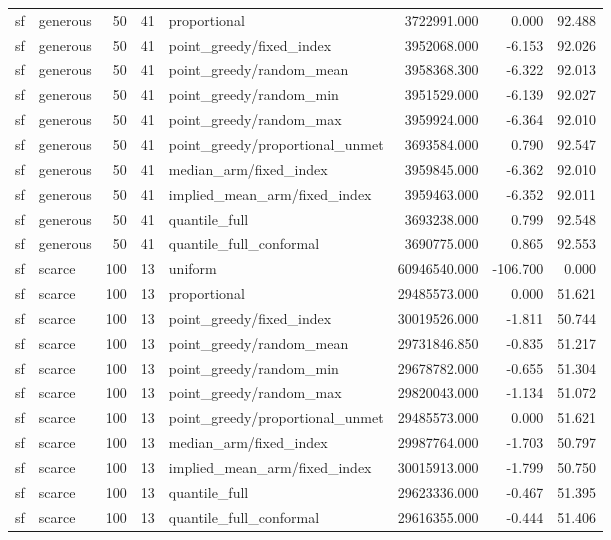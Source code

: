 \begin{tabular}{llrrlrrr}
sf & generous & 50 & 41 & proportional & 3722991.000 & 0.000 & 92.488 \\
sf & generous & 50 & 41 & point\_greedy/fixed\_index & 3952068.000 & -6.153 & 92.026 \\
sf & generous & 50 & 41 & point\_greedy/random\_mean & 3958368.300 & -6.322 & 92.013 \\
sf & generous & 50 & 41 & point\_greedy/random\_min & 3951529.000 & -6.139 & 92.027 \\
sf & generous & 50 & 41 & point\_greedy/random\_max & 3959924.000 & -6.364 & 92.010 \\
sf & generous & 50 & 41 & point\_greedy/proportional\_unmet & 3693584.000 & 0.790 & 92.547 \\
sf & generous & 50 & 41 & median\_arm/fixed\_index & 3959845.000 & -6.362 & 92.010 \\
sf & generous & 50 & 41 & implied\_mean\_arm/fixed\_index & 3959463.000 & -6.352 & 92.011 \\
sf & generous & 50 & 41 & quantile\_full & 3693238.000 & 0.799 & 92.548 \\
sf & generous & 50 & 41 & quantile\_full\_conformal & 3690775.000 & 0.865 & 92.553 \\
sf & scarce & 100 & 13 & uniform & 60946540.000 & -106.700 & 0.000 \\
sf & scarce & 100 & 13 & proportional & 29485573.000 & 0.000 & 51.621 \\
sf & scarce & 100 & 13 & point\_greedy/fixed\_index & 30019526.000 & -1.811 & 50.744 \\
sf & scarce & 100 & 13 & point\_greedy/random\_mean & 29731846.850 & -0.835 & 51.217 \\
sf & scarce & 100 & 13 & point\_greedy/random\_min & 29678782.000 & -0.655 & 51.304 \\
sf & scarce & 100 & 13 & point\_greedy/random\_max & 29820043.000 & -1.134 & 51.072 \\
sf & scarce & 100 & 13 & point\_greedy/proportional\_unmet & 29485573.000 & 0.000 & 51.621 \\
sf & scarce & 100 & 13 & median\_arm/fixed\_index & 29987764.000 & -1.703 & 50.797 \\
sf & scarce & 100 & 13 & implied\_mean\_arm/fixed\_index & 30015913.000 & -1.799 & 50.750 \\
sf & scarce & 100 & 13 & quantile\_full & 29623336.000 & -0.467 & 51.395 \\
sf & scarce & 100 & 13 & quantile\_full\_conformal & 29616355.000 & -0.444 & 51.406 \\

\end{tabular}
